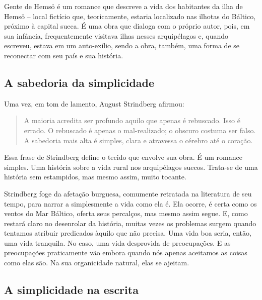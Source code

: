 \documentclass[12pt]{extarticle}
\begin{document}
Gente de Hemsö é um romance que descreve a vida dos habitantes da ilha
de Hemsö -- local fictício que, teoricamente, estaria localizado nas
ilhotas do Báltico, próximo à capital sueca. É uma obra que dialoga com
o próprio autor, pois, em sua infância, frequentemente visitava ilhas
nesses arquipélagos e, quando escreveu, estava em um auto-exílio, sendo
a obra, também, uma forma de se reconectar com seu país e sua história.




\subsection{A sabedoria da simplicidade}

Uma vez, em tom de lamento, August Strindberg afirmou:

\begin{quote}
A maioria acredita ser profundo aquilo que apenas é rebuscado. Isso é
errado. O rebuscado é apenas o mal-realizado; o obscuro costuma ser
falso. A sabedoria mais alta é simples, clara e atravessa o cérebro até
o coração.
\end{quote}

Essa frase de Strindberg define o tecido que envolve sua obra. É um
romance simples. Uma história sobre a vida rural nos arquipélagos
suecos. Trata-se de uma história sem estampidos, mas mesmo assim, muito
tocante.




Strindberg foge da afetação burguesa, comumente retratada na literatura
de seu tempo, para narrar a simplesmente a vida como ela é. Ela ocorre,
é certa como os ventos do Mar Báltico, oferta seus percalços, mas mesmo
assim segue. E, como restará claro no desenrolar da história, muitas
vezes os problemas surgem quando tentamos atribuir predicados àquilo que
não precisa. Uma vida boa seria, então, uma vida tranquila. No caso, uma
vida desprovida de preocupações. E as preocupações praticamente vão
embora quando nós apenas aceitamos as coisas como elas são. Na sua
organicidade natural, elas se ajeitam.




\subsection{A simplicidade na escrita}
\end{document}
